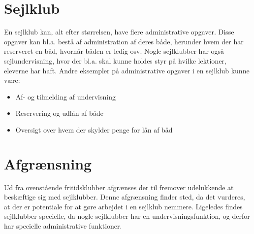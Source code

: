 \section{Sejlklub}

En sejlklub kan, alt efter størrelsen, have flere administrative opgaver.
Disse opgaver kan bl.a. bestå af administration af deres både, herunder hvem der har reserveret en båd, hvornår båden er ledig osv.
Nogle sejlklubber har også sejlundervisning, hvor der bl.a. skal kunne holdes styr på hvilke lektioner, eleverne har haft. 
Andre eksempler på administrative opgaver i en sejlklub kunne være:

\begin{itemize}
  \item Af- og tilmelding af undervisning
  \item Reservering og udlån af både 
  \item Oversigt over hvem der skylder penge for lån af båd
\end{itemize}

\section{Afgrænsning}

Ud fra ovenstående fritidsklubber afgrænses der til fremover udelukkende at beskæftige sig med sejlklubber. 
Denne afgrænsning finder sted, da det vurderes, at der er potentiale for at gøre arbejdet i en sejlklub nemmere. 
Ligeledes findes sejlklubber specielle, da nogle sejlklubber har en undervisningsfunktion, og derfor har specielle administrative funktioner.
